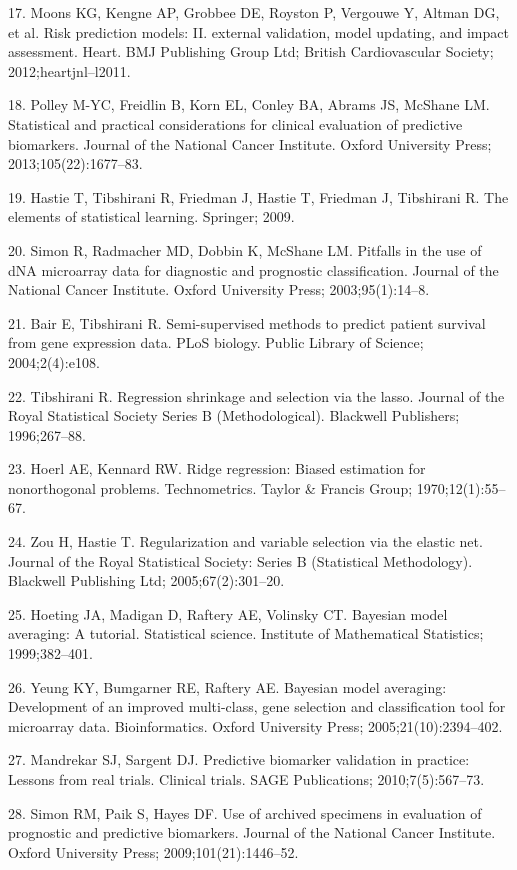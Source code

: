 \documentclass[11pt]{article}
\begin{document}
17. Moons KG, Kengne AP, Grobbee DE, Royston P, Vergouwe Y, Altman DG,
et al. Risk prediction models: II. external validation, model updating,
and impact assessment. Heart. BMJ Publishing Group Ltd; British
Cardiovascular Society; 2012;heartjnl--l2011.

18. Polley M-YC, Freidlin B, Korn EL, Conley BA, Abrams JS, McShane LM.
Statistical and practical considerations for clinical evaluation of
predictive biomarkers. Journal of the National Cancer Institute. Oxford
University Press; 2013;105(22):1677--83.

19. Hastie T, Tibshirani R, Friedman J, Hastie T, Friedman J, Tibshirani
R. The elements of statistical learning. Springer; 2009.

20. Simon R, Radmacher MD, Dobbin K, McShane LM. Pitfalls in the use of
dNA microarray data for diagnostic and prognostic classification.
Journal of the National Cancer Institute. Oxford University Press;
2003;95(1):14--8.

21. Bair E, Tibshirani R. Semi-supervised methods to predict patient
survival from gene expression data. PLoS biology. Public Library of
Science; 2004;2(4):e108.

22. Tibshirani R. Regression shrinkage and selection via the lasso.
Journal of the Royal Statistical Society Series B (Methodological).
Blackwell Publishers; 1996;267--88.

23. Hoerl AE, Kennard RW. Ridge regression: Biased estimation for
nonorthogonal problems. Technometrics. Taylor \& Francis Group;
1970;12(1):55--67.

24. Zou H, Hastie T. Regularization and variable selection via the
elastic net. Journal of the Royal Statistical Society: Series B
(Statistical Methodology). Blackwell Publishing Ltd; 2005;67(2):301--20.

25. Hoeting JA, Madigan D, Raftery AE, Volinsky CT. Bayesian model
averaging: A tutorial. Statistical science. Institute of Mathematical
Statistics; 1999;382--401.

26. Yeung KY, Bumgarner RE, Raftery AE. Bayesian model averaging:
Development of an improved multi-class, gene selection and
classification tool for microarray data. Bioinformatics. Oxford
University Press; 2005;21(10):2394--402.

27. Mandrekar SJ, Sargent DJ. Predictive biomarker validation in
practice: Lessons from real trials. Clinical trials. SAGE Publications;
2010;7(5):567--73.

28. Simon RM, Paik S, Hayes DF. Use of archived specimens in evaluation
of prognostic and predictive biomarkers. Journal of the National Cancer
Institute. Oxford University Press; 2009;101(21):1446--52.
\end{document}
